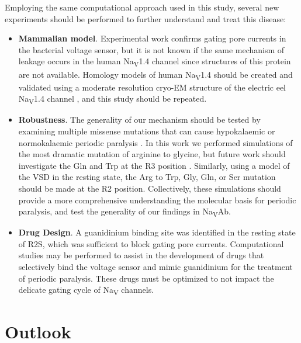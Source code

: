 \begin{refsection}
Employing the same computational approach used in this study, several new experiments should be performed to further understand and treat this disease:
\begin{itemize}
\item \textbf{Mammalian model}. Experimental work confirms gating pore currents in the bacterial voltage sensor, but it is not known if the same mechanism of leakage occurs in the human Na\textsubscript{V}1.4 channel since structures of this protein are not available. Homology models of human Na\textsubscript{V}1.4 should be created and validated using a moderate resolution cryo-EM structure of the electric eel Na\textsubscript{V}1.4 channel \cite{Yan:2017kda}, and this study should be repeated.
\item \textbf{Robustness}. The generality of our mechanism should be tested by examining multiple missense mutations that can cause hypokalaemic or normokalaemic periodic paralysis \cite{JurkatRott:2012kv,Moreau:2014jy}. In this work we performed simulations of the most dramatic mutation of arginine to glycine, but future work should investigate the Gln and Trp at the R3 position \cite{Jiang:2018ga}. Similarly, using a model of the VSD in the resting state, the Arg to Trp, Gly, Gln, or Ser mutation should be made at the R2 position. Collectively, these simulations should provide a more comprehensive understanding the molecular basis for periodic paralysis, and test the generality of our findings in Na\textsubscript{V}Ab.
\item \textbf{Drug Design}. A guanidinium binding site was identified in the resting state of R2S, which was sufficient to block gating pore currents. Computational studies may be performed to assist in the development of drugs that selectively bind the voltage sensor and mimic guanidinium for the treatment of periodic paralysis. These drugs must be optimized to not impact the delicate gating cycle of Na\textsubscript{V} channels.
\end{itemize}

\section{Outlook}


\end{refsection}
